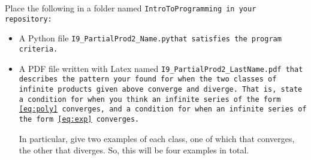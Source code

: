 \documentclass{article}
\newcommand\foldername{\tt{IntroToProgramming} }
\newcommand\filename{\tt{I9\_PartialProd2\_Name.py}\;\;}
\begin{document}
	
	Place the following in a folder named \foldername in your repository:
	\begin{itemize}
		\item A Python file \filename  that satisfies the program criteria.
		\item A PDF file written with Latex named \tt{I9\_PartialProd2\_LastName.pdf} that describes the pattern your found for when the two classes of infinite products given above converge and diverge.  That is, state a condition for when you think an infinite series of the form \eqref{eq:poly} converges, and a condition for when an infinite series of the form \eqref{eq:exp} converges.
		
		  In particular, give two examples of each class, one of which that converges, the other that diverges.  So, this will be four examples in total.
	\end{itemize}

	
\end{document}
